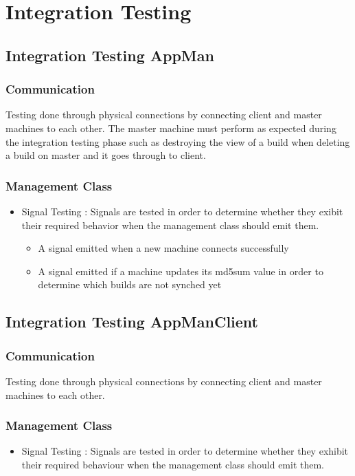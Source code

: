 \documentclass[a4paper,12pt,final]{article}
\begin{document}
\section{Integration Testing}

\subsection{Integration Testing AppMan}
\subsubsection{Communication}
Testing done through physical connections by connecting client and master machines to each other. The master machine must perform as expected during the integration testing phase such as destroying the view of a build when deleting a build on master and it goes through to client.
\subsubsection{Management Class}
\begin{itemize}
\item Signal Testing : Signals are tested in order to determine whether they exibit their required behavior when the management class should emit them.
\begin{itemize}
\item A signal emitted when a new machine connects successfully
\item A signal emitted if a machine updates its md5sum value in order to determine which builds are not synched yet
\end{itemize}
\end{itemize}







\subsection{Integration Testing AppManClient}

\subsubsection{Communication}
Testing done through physical connections by connecting client and master machines to each other.
\subsubsection{Management Class}
\begin{itemize}
\item Signal Testing : Signals are tested in order to determine whether they exhibit their required behaviour when the management class should emit them.
\end{itemize}
\end{document}
